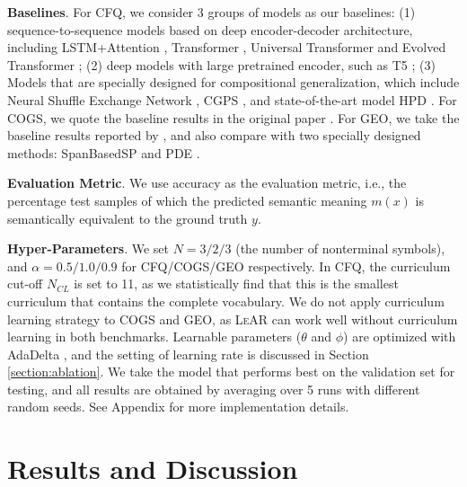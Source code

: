 \documentclass[11pt,a4paper]{article}
\begin{document}
\noindent \textbf{Baselines}.
For CFQ, we consider 3 groups of models as our baselines:
(1) sequence-to-sequence models based on deep encoder-decoder architecture, including LSTM+Attention \cite{hochreiter1997long, bahdanau2014neural}, Transformer \cite{vaswani2017attention}, Universal Transformer \cite{dehghani2018universal} and Evolved Transformer \cite{so2019evolved};
(2) deep models with large pretrained encoder, such as T5 \cite{raffel2019exploring};
(3) Models that are specially designed for compositional generalization, which include Neural Shuffle Exchange Network \cite{freivalds2019neural}, CGPS \cite{li2019compositional}, and state-of-the-art model HPD \cite{guo2020hierarchical}.
For COGS, we quote the baseline results in the original paper \cite{kim2020cogs}.
For GEO, we take the baseline results reported by \citet{herzig2020span-csp}, and also compare with two specially designed methods: SpanBasedSP \cite{herzig2020span-csp} and PDE \cite{guo2020geoiterative}.

\noindent \textbf{Evaluation Metric}.
We use accuracy as the evaluation metric, i.e., the percentage test samples of which the predicted semantic meaning $m(x)$ is semantically equivalent to the ground truth $y$.

\noindent \textbf{Hyper-Parameters}.
We set $N=3/2/3$ (the number of nonterminal symbols), and $\alpha=0.5/1.0/0.9$ for CFQ/COGS/GEO respectively.
In CFQ, the curriculum cut-off $N_{CL}$ is set to 11, as we statistically find that this is the smallest curriculum that contains the complete vocabulary.
We do not apply curriculum learning strategy to COGS and GEO, as \textsc{LeAR} can work well without curriculum learning in both benchmarks.
Learnable parameters ($\theta$ and $\phi$) are optimized with AdaDelta \cite{adadelta_2012-apd}, and the setting of learning rate is discussed in Section \ref{section:ablation}.
We take the model that performs best on the validation set for testing, and all results are obtained by averaging over 5 runs with different random seeds.
See Appendix for more implementation details.

\section{Results and Discussion}
\end{document}
